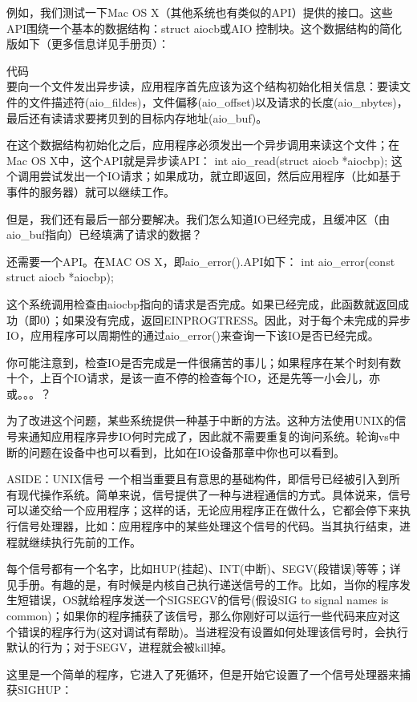 例如，我们测试一下Mac OS X（其他系统也有类似的API）提供的接口。这些API围绕一个基本的数据结构：struct aiocb或AIO 控制块。这个数据结构的简化版如下（更多信息详见手册页）：

代码\\

要向一个文件发出异步读，应用程序首先应该为这个结构初始化相关信息：要读文件的文件描述符(aio\_fildes)，文件偏移(aio\_offset)以及请求的长度(aio\_nbytes)，最后还有读请求要拷贝到的目标内存地址(aio\_buf)。

在这个数据结构初始化之后，应用程序必须发出一个异步调用来读这个文件；在Mac OS X中，这个API就是异步读API：
int aio\_read(struct aiocb *aiocbp);
这个调用尝试发出一个IO请求；如果成功，就立即返回，然后应用程序（比如基于事件的服务器）就可以继续工作。

但是，我们还有最后一部分要解决。我们怎么知道IO已经完成，且缓冲区（由aio\_buf指向）已经填满了请求的数据？

还需要一个API。在MAC OS X，即aio\_error().API如下：
int aio\_error(const struct aiocb *aiocbp);

这个系统调用检查由aiocbp指向的请求是否完成。如果已经完成，此函数就返回成功（即0）；如果没有完成，返回EINPROGTRESS。因此，对于每个未完成的异步IO，应用程序可以周期性的通过aio\_error()来查询一下该IO是否已经完成。

你可能注意到，检查IO是否完成是一件很痛苦的事儿；如果程序在某个时刻有数十个，上百个IO请求，是该一直不停的检查每个IO，还是先等一小会儿，亦或。。。？

为了改进这个问题，某些系统提供一种基于中断的方法。这种方法使用UNIX的信号来通知应用程序异步IO何时完成了，因此就不需要重复的询问系统。轮询vs中断的问题在设备中也可以看到，比如在IO设备那章中你也可以看到。

ASIDE：UNIX信号
一个相当重要且有意思的基础构件，即信号已经被引入到所有现代操作系统。简单来说，信号提供了一种与进程通信的方式。具体说来，信号可以递交给一个应用程序；这样的话，无论应用程序正在做什么，它都会停下来执行信号处理器，比如：应用程序中的某些处理这个信号的代码。当其执行结束，进程就继续执行先前的工作。

每个信号都有一个名字，比如HUP(挂起)、INT(中断)、SEGV(段错误)等等；详见手册。有趣的是，有时候是内核自己执行递送信号的工作。比如，当你的程序发生短错误，OS就给程序发送一个SIGSEGV的信号(假设SIG to signal names is common)；如果你的程序捕获了该信号，那么你刚好可以运行一些代码来应对这个错误的程序行为(这对调试有帮助)。当进程没有设置如何处理该信号时，会执行默认的行为；对于SEGV，进程就会被kill掉。

这里是一个简单的程序，它进入了死循环，但是开始它设置了一个信号处理器来捕获SIGHUP：

